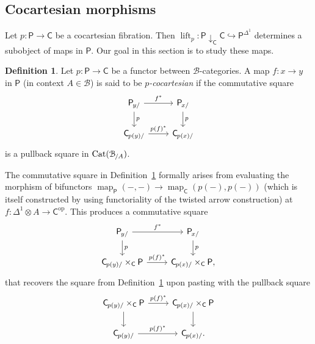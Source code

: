 \documentclass[reqno]{amsart}
\numberwithin{equation}{subsection}
\theoremstyle{plain}
\theoremstyle{definition}
\newtheorem{definition}[equation]{Definition}
\let\scr=\mathcal
\let\into=\hookrightarrow
\def\BB{\scr B}
\DeclareMathOperator{\Cat}{Cat}
\DeclareMathOperator{\Map}{map}
\DeclareMathOperator{\lift}{lift}
\newcommand{\op}{\mathrm{op}}
\newcommand{\map}[1]{\Map_{#1}}
\newcommand{\Over}[2]{#1_{\hspace{-1pt}/#2}}
\newcommand{\Under}[2]{#1_{\hspace{-1pt}#2/}}
\newcommand{\I}[1]{\mathsf{#1}}
\newcommand{\Comma}[3]{{#1}\downarrow_{#2}{#3}}
\begin{document}
\subsection{Cocartesian morphisms}
\label{sec:cocartesianMorphisms}
Let $p\colon\I{P}\to\I{C}$ be a cocartesian fibration. Then $\lift_p\colon \Comma{\I{P}}{\I{C}}{\I{C}}\into\I{P}^{\Delta^1}$ determines a subobject of maps in $\I{P}$. Our goal in this section is to study these maps.

\begin{definition}
	\label{def:cocartesianMorphism}
	Let $p\colon \I{P}\to\I{C}$ be a functor between $\BB$-categories. A map $f\colon x\to y$ in $\I{P}$ (in context $A\in\BB$) is said to be \emph{$p$-cocartesian} if the commutative square
	\begin{equation*}
	\begin{tikzcd}
	\Under{\I{P}}{y}\arrow[r, "f^\ast"]\arrow[d, "p"] & \Under{\I{P}}{x}\arrow[d, "p"]\\
	\Under{\I{C}}{p(y)}\arrow[r, "p(f)^\ast"] & \Under{\I{C}}{p(x)}
	\end{tikzcd}
	\end{equation*}
	is a pullback square in $\Cat(\Over{\BB}{A})$.
\end{definition}
The commutative square in Definition~\ref{def:cocartesianMorphism} formally arises from evaluating the morphism of bifunctors $\map{\I{P}}(-,-)\to\map{\I{C}}(p(-),p(-))$ (which is itself constructed by using functoriality of the twisted arrow construction) at $f\colon \Delta^1\otimes A\to \I{C}^{\op}$. This produces a commutative square
\begin{equation*}
		\begin{tikzcd}
		\Under{\I{P}}{y}\arrow[r, "f^\ast"]\arrow[d, "p"] & \Under{\I{P}}{x}\arrow[d, "p"]\\
		\Under{\I{C}}{p(y)}\times_{\I{C}}\I{P}\arrow[r, "p(f)^\ast"] & \Under{\I{C}}{p(x)}\times_{\I{C}}\I{{P}},
		\end{tikzcd}
\end{equation*}
that recovers the square from Definition~\ref{def:cocartesianMorphism} upon pasting with the pullback square
	\begin{equation*}
			\begin{tikzcd}
			\Under{\I{C}}{p(y)}\times_{\I{C}}\I{P}\arrow[r, "p(f)^\ast"]\arrow[d] & \Under{\I{C}}{p(x)}\times_{\I{C}}\I{{P}}\arrow[d]\\
			\Under{\I{C}}{p(y)}\arrow[r, "p(f)^\ast"] & \Under{\I{C}}{p(x)}.
			\end{tikzcd}
	\end{equation*}
\end{document}

